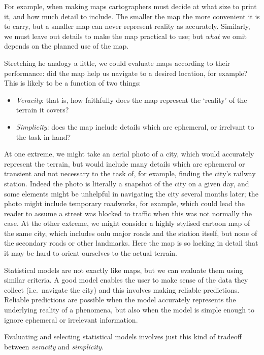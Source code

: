 \documentclass[]{article}
\providecommand{\tightlist}{%
  \setlength{\itemsep}{0pt}\setlength{\parskip}{0pt}}
\begin{document}
For example, when making maps cartographers must decide at what size to print
it, and how much detail to include. The smaller the map the more convenient it
is to carry, but a smaller map can never represent reality as accurately.
Similarly, we must leave out details to make the map practical to use; but
\emph{what} we omit depends on the planned use of the map.

Stretching he analogy a little, we could evaluate maps according to their
performance: did the map help us navigate to a desired location, for example?
This is likely to be a function of two things:

\begin{itemize}
\tightlist
\item
  \emph{Veracity}: that is, how faithfully does the map represent the `reality' of
  the terrain it covers?
\item
  \emph{Simplicity}: does the map include details which are ephemeral, or irrelvant
  to the task in hand?
\end{itemize}

At one extreme, we might take an aerial photo of a city, which would accurately
represent the terrain, but would include many details which are ephemeral or
transient and not necessary to the task of, for example, finding the city's
railway station. Indeed the photo is literally a snapshot of the city on a given
day, and some elements might be unhelpful in navigating the city several months
later; the photo might include temporary roadworks, for example, which could
lead the reader to assume a street was blocked to traffic when this was not
normally the case. At the other extreme, we might consider a highly stylised
cartoon map of the same city, which includes onlu major roads and the station
itself, but none of the secondary roads or other landmarks. Here the map is so
lacking in detail that it may be hard to orient ourselves to the actual terrain.

Statistical models are not exactly like maps, but we can evaluate them using
similar criteria. A good model enables the user to make sense of the data they
collect (i.e.~navigate the city) and this involves making reliable predictions.
Reliable predictions are possible when the model accurately represents the
underlying reality of a phenomena, but also when the model is simple enough to
ignore ephemeral or irrelevant information.

Evaluating and selecting statistical models involves just this kind of tradeoff
between \emph{veracity} and \emph{simplicity}.
\end{document}
